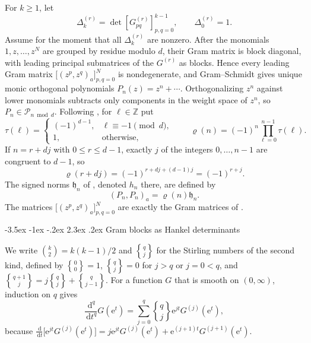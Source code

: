 \documentclass[twoside,10pt]{article}
\makeatletter
\numberwithin{equation}{section}
\theoremstyle{slbody}
\theoremstyle{remark}
\newcommand{\dd}{\,\mathrm d}
\newcommand{\e}{\mathrm e}
\newcommand{\fh}{\mathfrak h}
\newcommand{\stir}[2]{\genfrac\{\}{0pt}{}{#1}{#2}}
\renewcommand{\section}{%
  \@startsection{section}{1}{\z@}%
    {-3.5ex \@plus -1ex \@minus -.2ex}%
    {2.3ex \@plus .2ex}%
    {\normalfont\large\bfseries}}
\makeatother
\begin{document}
For \(k\geq1\), let
\begin{equation}
\Delta_k^{(r)}
=\det[G_{pq}^{(r)}]_{p,q=0}^{k-1},
\qquad
\Delta_0^{(r)}=1.
\label{eq:Delta}
\end{equation}
Assume for the moment that all \(\Delta_k^{(r)}\) are nonzero.  After
the monomials \(1,z,\ldots,z^N\) are grouped by residue modulo \(d\),
their Gram matrix is block diagonal, with leading principal submatrices
of the \(G^{(r)}\) as blocks.  Hence every leading Gram matrix
\(\big[(z^p,z^q)_a\big]_{p,q=0}^{N}\) is nondegenerate, and Gram--Schmidt
gives unique monic orthogonal polynomials \(P_n(z)=z^n+\cdots\).
Orthogonalizing \(z^n\) against lower monomials subtracts only
components in the weight space of \(z^n\), so
\(P_n\in\mathcal P_{n\bmod d}\).  Following
\cite[Lemma~3.4 and Example~3.5]{FelderHoppe2025}, for \(\ell\in\mathbb Z\)
put
\begin{equation}
\tau(\ell)=
\begin{cases}
(-1)^{d-1},&\ell\equiv-1\pmod d,\\
1,&\text{otherwise},
\end{cases}
\qquad
\varrho(n)=(-1)^n\prod_{\ell=0}^{n-1}\tau(\ell).
\label{eq:rho-sign}
\end{equation}
If \(n=r+dj\) with \(0\leq r\leq d-1\), exactly \(j\) of the integers
\(0,\ldots,n-1\) are congruent to \(d-1\), so
\begin{equation}
\varrho(r+dj)=(-1)^{r+dj+(d-1)j}=(-1)^{r+j}.
\label{eq:rho-block}
\end{equation}
The signed norms \(\fh_n\) of \cite[Section~3.1]{FelderHoppe2025},
denoted \(h_n\) there, are defined by
\begin{equation}
(P_n,P_n)_a=\varrho(n)\fh_n.
\label{eq:signed-norm}
\end{equation}
The matrices \(\big[(z^p,z^q)_a\big]_{p,q=0}^{N}\) are exactly the Gram
matrices of \cite[Conjecture~3.6]{FelderHoppe2025}.

\section{Gram blocks as Hankel determinants}\label{sec:hankel}

We write \(\binom k2=k(k-1)/2\) and \(\stir{q}{j}\) for the Stirling numbers
of the second kind, defined by \(\stir00=1\), \(\stir q j=0\) for \(j>q\)
or \(j=0<q\), and \(\stir{q+1}{j}=j\stir qj+\stir q{j-1}\).  For a
function \(G\) that is smooth on \((0,\infty)\), induction on \(q\) gives
\begin{equation}
\frac{\dd^q}{\dd t^q}G(\e^t)
=\sum_{j=0}^q\stir qj\e^{jt}G^{(j)}(\e^t),
\label{eq:stirling}
\end{equation}
because \(\frac{\dd}{\dd t}\bigl[\e^{jt}G^{(j)}(\e^t)\bigr]
=j\e^{jt}G^{(j)}(\e^t)+\e^{(j+1)t}G^{(j+1)}(\e^t)\).
\end{document}
